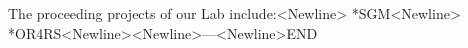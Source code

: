 The proceeding projects of our Lab include:<Newline>   *SGM<Newline>   *OR4RS<Newline><Newline>---<Newline>END
